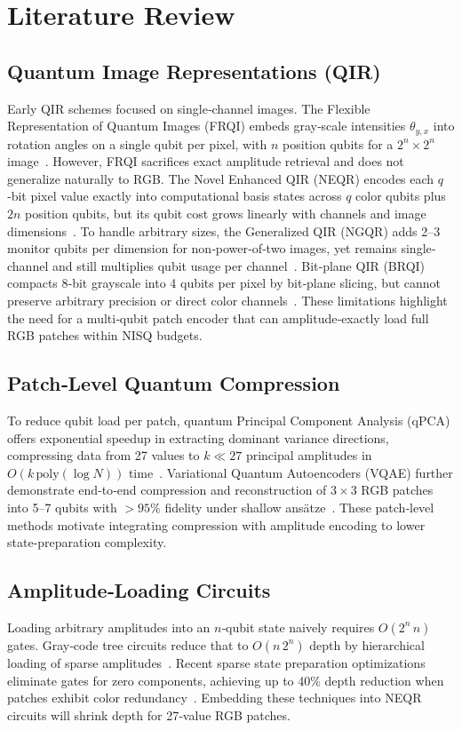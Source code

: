 \documentclass[onecolumn,12pt]{IEEEtran}
\begin{document}
\section{Literature Review}
\subsection{Quantum Image Representations (QIR)}
Early QIR schemes focused on single‐channel images. The Flexible Representation of Quantum Images (FRQI) embeds gray‐scale intensities $\theta_{y,x}$ into rotation angles on a single qubit per pixel, with $n$ position qubits for a $2^n\times2^n$ image~\cite{le2011frqi}. However, FRQI sacrifices exact amplitude retrieval and does not generalize naturally to RGB. The Novel Enhanced QIR (NEQR) encodes each $q$‐bit pixel value exactly into computational basis states across $q$ color qubits plus $2n$ position qubits, but its qubit cost grows linearly with channels and image dimensions~\cite{zhang2013neqr}. To handle arbitrary sizes, the Generalized QIR (NGQR) adds 2–3 monitor qubits per dimension for non‐power‐of‐two images, yet remains single‐channel and still multiplies qubit usage per channel~\cite{xing2024ngqr}. Bit‐plane QIR (BRQI) compacts 8‐bit grayscale into 4 qubits per pixel by bit‐plane slicing, but cannot preserve arbitrary precision or direct color channels~\cite{li2018bitplane}. These limitations highlight the need for a multi‐qubit patch encoder that can amplitude‐exactly load full RGB patches within NISQ budgets.

\subsection{Patch‐Level Quantum Compression}
To reduce qubit load per patch, quantum Principal Component Analysis (qPCA) offers exponential speedup in extracting dominant variance directions, compressing data from 27 values to $k\ll 27$ principal amplitudes in $O(k\,\mathrm{poly}(\log N))$ time~\cite{yu2019quantum}. Variational Quantum Autoencoders (VQAE) further demonstrate end‐to‐end compression and reconstruction of $3\times3$ RGB patches into 5–7 qubits with $>95\%$ fidelity under shallow ansätze~\cite{romero2017quantum}. These patch‐level methods motivate integrating compression with amplitude encoding to lower state‐preparation complexity.

\subsection{Amplitude‐Loading Circuits}
Loading arbitrary amplitudes into an $n$‐qubit state naively requires $O(2^n\,n)$ gates. Gray‐code tree circuits reduce that to $O(n\,2^n)$ depth by hierarchical loading of sparse amplitudes~\cite{plessch2011quantum}. Recent sparse state preparation optimizations eliminate gates for zero components, achieving up to 40\% depth reduction when patches exhibit color redundancy~\cite{zalka1999grover}. Embedding these techniques into NEQR circuits will shrink depth for 27‐value RGB patches.
\end{document}
